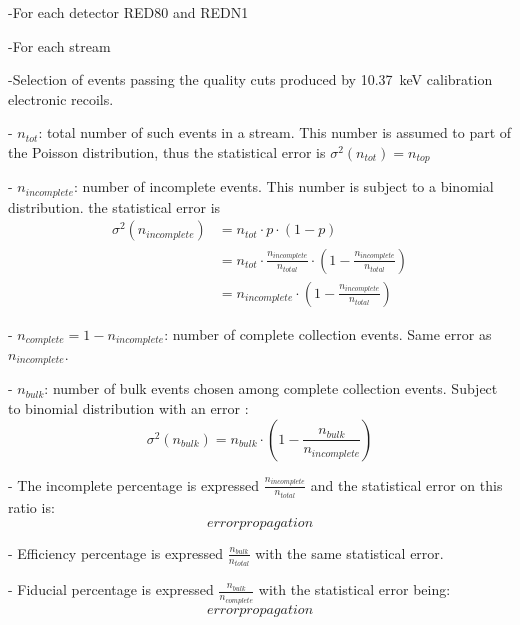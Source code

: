 -For each detector RED80 and REDN1

-For each stream

-Selection of events passing the quality cuts produced by \SI{10.37}{\kilo\eV} calibration electronic recoils.

- $n_{tot}$: total number of such events in a stream. This number is assumed to part of the Poisson distribution, thus the statistical error is $\sigma^2 (n_{tot}) = n_{top}$

- $n_{incomplete}$: number of incomplete events. This number is subject to a binomial distribution. the statistical error is 
\begin{align}
\sigma^2 (n_{incomplete} )
&=
n_{tot} \cdot p \cdot (1-p)
\\
&=
n_{tot} \cdot \frac{n_{incomplete}}{n_{total}} \cdot \left( 1 - \frac{n_{incomplete}}{n_{total}}  \right)
\\
&= 
n_{incomplete} \cdot \left( 1 - \frac{n_{incomplete}}{n_{total}}  \right)
\end{align}

- $n_{complete} = 1 - n_{incomplete} $: number of complete collection events. Same error as $n_{incomplete}$.

- $n_{bulk}$: number of bulk events chosen among complete collection events. Subject to binomial distribution with an error :
\begin{equation}
\sigma^2 (n_{bulk} )
= 
n_{bulk} \cdot \left( 1 - \frac{n_{bulk}}{n_{incomplete}}  \right)
\end{equation}

- The incomplete percentage is expressed $\frac{n_{incomplete}}{n_{total}}$ and the statistical error on this ratio is:
$$ error propagation $$


- Efficiency percentage is expressed $\frac{n_{bulk}}{n_{total}}$ with the same statistical error.

- Fiducial percentage is expressed $\frac{n_{bulk}}{n_{complete}}$ with the statistical error being:
$$ error propagation $$
%

